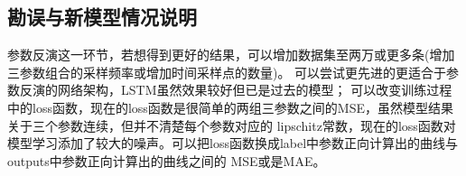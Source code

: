 \documentclass{article}
\begin{document}
\subsection*{勘误与新模型情况说明}

参数反演这一环节，若想得到更好的结果，可以增加数据集至两万或更多条(增加三参数组合的采样频率或增加时间采样点的数量)。
可以尝试更先进的更适合于参数反演的网络架构，LSTM虽然效果较好但已是过去的模型；
可以改变训练过程中的loss函数，现在的loss函数是很简单的两组三参数之间的MSE，虽然模型结果关于三个参数连续，但并不清楚每个参数对应的
lipschitz常数，现在的loss函数对模型学习添加了较大的噪声。可以把loss函数换成label中参数正向计算出的曲线与outputs中参数正向计算出的曲线之间的
MSE或是MAE。
\end{document}

